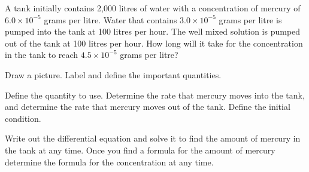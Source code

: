   \begin{problem}

  \item A tank initially contains 2,000 litres of water with a
    concentration of mercury of $6.0\times 10^{-5}$ grams per
    litre. Water that contains $3.0\times 10^{-5}$ grams per litre is
    pumped into the tank at 100 litres per hour. The well mixed
    solution is pumped out of the tank at 100 litres per hour.  How
    long will it take for the concentration in the tank to reach
    $4.5\times 10^{-5}$ grams per litre?

    \begin{subproblem}
      \item Draw a picture. Label and define the important quantities.
        \vfill

      \item Define the quantity to use. Determine the rate that
        mercury moves into the tank, and determine the rate that
        mercury moves out of the tank. Define the initial condition.
        \vfill

        \clearpage

      \item Write out the differential equation and solve it to find
        the amount of mercury in the tank at any time. Once you find a
        formula for the amount of mercury determine the formula for
        the concentration at any time.

        \vfill
        

    \end{subproblem}



\end{problem}
